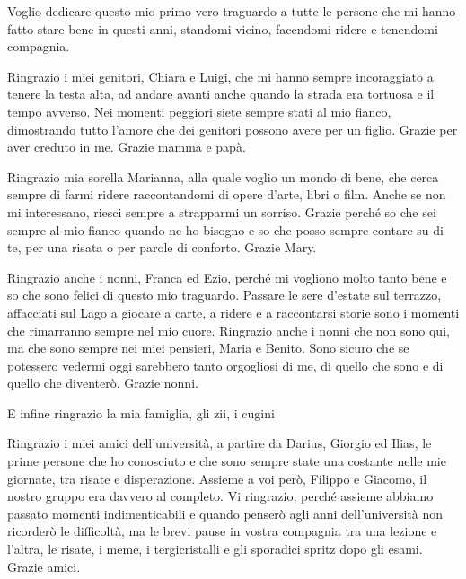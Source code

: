 \newenvironment{dedication}
    {
    \clearpage %
    \thispagestyle{empty} %
    \vspace*{\stretch{1}} %
    \begin{center}\begin{em}}
    {\end{em}\end{center}
    \vspace*{\stretch{2}} %
    \clearpage %
    }



\begin{dedication}
  Voglio dedicare questo mio primo vero traguardo a tutte le persone che mi hanno fatto stare bene in questi anni, standomi vicino, facendomi ridere e tenendomi compagnia. 

  Ringrazio i miei genitori, Chiara e Luigi, che mi hanno sempre incoraggiato a tenere la testa alta, ad andare avanti anche quando la strada era tortuosa e il tempo avverso. Nei momenti peggiori siete sempre stati al mio fianco, dimostrando tutto l'amore che dei genitori possono avere per un figlio. Grazie per aver creduto in me. Grazie mamma e papà.

  Ringrazio mia sorella Marianna, alla quale voglio un mondo di bene, che cerca sempre di farmi ridere raccontandomi di opere d'arte, libri o film. Anche se non mi interessano, riesci sempre a strapparmi un sorriso. Grazie perché so che sei sempre al mio fianco quando ne ho bisogno e so che posso sempre contare su di te, per una risata o per parole di conforto. Grazie Mary.

  Ringrazio anche i nonni, Franca ed Ezio, perché mi vogliono molto tanto bene e so che sono felici di questo mio traguardo. Passare le sere d'estate sul terrazzo, affacciati sul Lago a giocare a carte, a ridere e a raccontarsi storie sono i momenti che rimarranno sempre nel mio cuore. Ringrazio anche i nonni che non sono qui, ma che sono sempre nei miei pensieri, Maria e Benito. Sono sicuro che se potessero vedermi oggi sarebbero tanto orgogliosi di me, di quello che sono e di quello che diventerò. Grazie nonni.

  E infine ringrazio la mia famiglia, gli zii, i cugini 

  \vspace{2cm}


  Ringrazio i miei amici dell'università, a partire da Darius, Giorgio ed Ilias, le prime persone che ho conosciuto e che sono sempre state una costante nelle mie giornate, tra risate e disperazione. Assieme a voi però, Filippo e Giacomo, il nostro gruppo era davvero al completo. Vi ringrazio, perché assieme abbiamo passato momenti indimenticabili e quando penserò agli anni dell'università non ricorderò le difficoltà, ma le brevi pause in vostra compagnia tra una lezione e l'altra, le risate, i meme, i tergicristalli e gli sporadici spritz dopo gli esami. Grazie amici.


\end{dedication}
